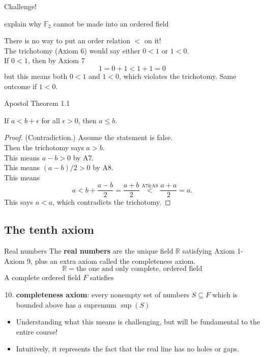 \documentclass{beamer}
\begin{document}
\begin{frame}{Challenge!}
\begin{prob}
explain why $\mathbb{F}_2$ cannot be made into an ordered field
\end{prob}
\pause
\begin{soln}
There is no way to put an order relation $<$ on it!\\
\pause
The trichotomy (Axiom 6) would say either $0 < 1$ or $1 < 0$.\\
\pause
If $0 < 1$, then by Axiom 7
$$ 1 = 0+1 < 1+1 = 0$$
but this means both $0 < 1$ and $1 < 0$, which violates the trichotomy.
\pause
Same outcome if $1 < 0$.
\end{soln}
\end{frame}

\begin{frame}{Apostol Theorem 1.1}
\begin{thm}
If $a < b + \epsilon$ for all $\epsilon > 0$, then $a\leq b$.
\end{thm}
\pause
\begin{proof}
(Contradiction.)  Assume the statement is false.\\
\pause
Then the trichotomy says $a > b$.\\
\pause
This means $a-b > 0$ by A7.\\
\pause
This means $(a-b)/2 > 0$ by A8.\\
\pause
This means
$$a < b + \frac{a-b}{2} = \frac{a+b}{2} \stackrel{\text{A7\&A8}}{<} \frac{a+a}{2} = a.$$
\pause
This says $a < a$, which contradicts the trichotomy.
\end{proof}
\end{frame}

\subsection{The tenth axiom}

\begin{frame}{Real numbers}
The \textbf{real numbers} are the unique field $\mathbb{R}$ satisfying Axiom 1-Axiom 9, plus an extra axiom called the completeness axiom.
$$\mathbb{R} = \text{the one and only complete, ordered field}$$
A complete ordered field $F$ satisfies
\begin{enumerate}[\text{A}1]
\setcounter{enumi}{9}
\pause
\item \textbf{completeness axiom}: every nonempty set of numbers $S\subseteq F$ which is bounded above has a supremum $\sup(S)$
\end{enumerate}
\begin{itemize}
\pause
\item Understanding what this means is challenging, but will be fundamental to the entire course!
\pause
\item Intuitively, it represents the fact that the real line has no holes or gaps.
\end{itemize}
\end{frame}
\end{document}
